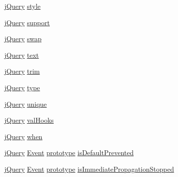 \begin{DoxyCompactItemize}
\item 
\hyperlink{jquery_8rateyo_8min_8js_a2b1d6f9c448e3ce72f4e1865d6e38d2c}{j\+Query} \hyperlink{jquery-2_82_81-vsdoc_8js_af3f76f18e38dd06c0a345ede43abb420}{style}
\item 
\hyperlink{jquery_8rateyo_8min_8js_a2b1d6f9c448e3ce72f4e1865d6e38d2c}{j\+Query} \hyperlink{jquery-2_82_81-vsdoc_8js_a1be69652377630fc5432ae5ec6463744}{support}
\item 
\hyperlink{jquery_8rateyo_8min_8js_a2b1d6f9c448e3ce72f4e1865d6e38d2c}{j\+Query} \hyperlink{jquery-2_82_81-vsdoc_8js_a5e5b5f48f4ead1c526f9a8aede2780ef}{swap}
\item 
\hyperlink{jquery_8rateyo_8min_8js_a2b1d6f9c448e3ce72f4e1865d6e38d2c}{j\+Query} \hyperlink{jquery-2_82_81-vsdoc_8js_aa5b77da29631a344064bb3d20c8702de}{text}
\item 
\hyperlink{jquery_8rateyo_8min_8js_a2b1d6f9c448e3ce72f4e1865d6e38d2c}{j\+Query} \hyperlink{jquery-2_82_81-vsdoc_8js_a5c6bdf61ecee84c4d51137801d3fac85}{trim}
\item 
\hyperlink{jquery_8rateyo_8min_8js_a2b1d6f9c448e3ce72f4e1865d6e38d2c}{j\+Query} \hyperlink{jquery-2_82_81-vsdoc_8js_a3940565e83a9bfd10d95ffd27536da91}{type}
\item 
\hyperlink{jquery_8rateyo_8min_8js_a2b1d6f9c448e3ce72f4e1865d6e38d2c}{j\+Query} \hyperlink{jquery-2_82_81-vsdoc_8js_a55d5adf9da69a81b8295f6bedfc34f60}{unique}
\item 
\hyperlink{jquery_8rateyo_8min_8js_a2b1d6f9c448e3ce72f4e1865d6e38d2c}{j\+Query} \hyperlink{jquery-2_82_81-vsdoc_8js_abd13691499fe1269b0042dae2caec0c1}{val\+Hooks}
\item 
\hyperlink{jquery_8rateyo_8min_8js_a2b1d6f9c448e3ce72f4e1865d6e38d2c}{j\+Query} \hyperlink{jquery-2_82_81-vsdoc_8js_ad5b56e8490e5084272548eebb74b82d6}{when}
\item 
\hyperlink{jquery_8rateyo_8min_8js_a2b1d6f9c448e3ce72f4e1865d6e38d2c}{j\+Query} \hyperlink{jquery-2_82_81-vsdoc_8js_a2cc2bb482e56b47f47b4ee54d670a418}{Event} \hyperlink{geolocation-marker_8js_acdc5169db2a3bf7f13f158c44020c153}{prototype} \hyperlink{jquery-2_82_81-vsdoc_8js_af36c584d7af0deb379b8d6e3116775cc}{is\+Default\+Prevented}
\item 
\hyperlink{jquery_8rateyo_8min_8js_a2b1d6f9c448e3ce72f4e1865d6e38d2c}{j\+Query} \hyperlink{jquery-2_82_81-vsdoc_8js_a2cc2bb482e56b47f47b4ee54d670a418}{Event} \hyperlink{geolocation-marker_8js_acdc5169db2a3bf7f13f158c44020c153}{prototype} \hyperlink{jquery-2_82_81-vsdoc_8js_a5fe8157d3a55c7b444e8d97b9dcde6a8}{is\+Immediate\+Propagation\+Stopped}

\end{DoxyCompactItemize}
